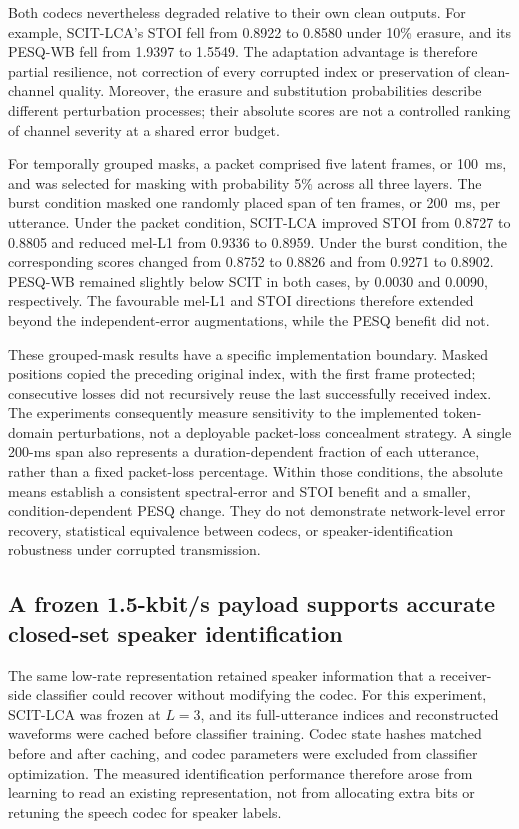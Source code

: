 Both codecs nevertheless degraded relative to their own clean outputs. For example, SCIT-LCA's STOI fell from 0.8922 to 0.8580 under 10\% erasure, and its PESQ-WB fell from 1.9397 to 1.5549. The adaptation advantage is therefore partial resilience, not correction of every corrupted index or preservation of clean-channel quality. Moreover, the erasure and substitution probabilities describe different perturbation processes; their absolute scores are not a controlled ranking of channel severity at a shared error budget.

For temporally grouped masks, a packet comprised five latent frames, or 100~ms, and was selected for masking with probability 5\% across all three layers. The burst condition masked one randomly placed span of ten frames, or 200~ms, per utterance. Under the packet condition, SCIT-LCA improved STOI from 0.8727 to 0.8805 and reduced mel-L1 from 0.9336 to 0.8959. Under the burst condition, the corresponding scores changed from 0.8752 to 0.8826 and from 0.9271 to 0.8902. PESQ-WB remained slightly below SCIT in both cases, by 0.0030 and 0.0090, respectively. The favourable mel-L1 and STOI directions therefore extended beyond the independent-error augmentations, while the PESQ benefit did not.

These grouped-mask results have a specific implementation boundary. Masked positions copied the preceding original index, with the first frame protected; consecutive losses did not recursively reuse the last successfully received index. The experiments consequently measure sensitivity to the implemented token-domain perturbations, not a deployable packet-loss concealment strategy. A single 200-ms span also represents a duration-dependent fraction of each utterance, rather than a fixed packet-loss percentage. Within those conditions, the absolute means establish a consistent spectral-error and STOI benefit and a smaller, condition-dependent PESQ change. They do not demonstrate network-level error recovery, statistical equivalence between codecs, or speaker-identification robustness under corrupted transmission.



\subsection{A frozen 1.5-kbit/s payload supports accurate closed-set speaker identification}
\label{sec:rv2-speaker}
The same low-rate representation retained speaker information that a receiver-side classifier could recover without modifying the codec. For this experiment, SCIT-LCA was frozen at $L=3$, and its full-utterance indices and reconstructed waveforms were cached before classifier training. Codec state hashes matched before and after caching, and codec parameters were excluded from classifier optimization. The measured identification performance therefore arose from learning to read an existing representation, not from allocating extra bits or retuning the speech codec for speaker labels.

